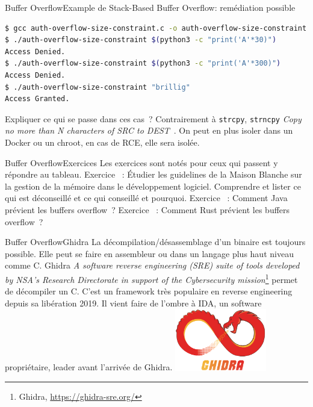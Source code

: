 \documentclass{beamer}
\begin{document}
    \begin{frame}[fragile]{Buffer Overflow}{Example de Stack-Based Buffer Overflow: remédiation possible}
        \begin{lstlisting}[language=bash]
$ gcc auth-overflow-size-constraint.c -o auth-overflow-size-constraint
$ ./auth-overflow-size-constraint $(python3 -c "print('A'*30)")
Access Denied.
$ ./auth-overflow-size-constraint $(python3 -c "print('A'*300)")
Access Denied.
$ ./auth-overflow-size-constraint "brillig"
Access Granted.
        \end{lstlisting}
        Expliquer ce qui se passe dans ces cas~?
        \pause
        \bigbreak
        Contrairement à \lstinline{strcpy}, \lstinline{strncpy} \textit{Copy no more than N characters of SRC to DEST}~.
        \bigbreak
        On peut en plus isoler dans un Docker ou un chroot, en cas de RCE, elle sera isolée.
    \end{frame}

    \begin{frame}{Buffer Overflow}{Exercices}
        Les exercices sont notés pour ceux qui passent y répondre au tableau.
        \bigbreak
        Exercice \execcounterdispinc{}~:
        Étudier les guidelines de la Maison Blanche sur la gestion de la mémoire dans le développement logiciel.
        \bigbreak
        Comprendre et lister ce qui est déconseillé et ce qui conseillé et pourquoi.
        Exercice \execcounterdispinc{}~:
        Comment Java prévient les buffers overflow~?
        \bigbreak
        Exercice \execcounterdispinc{}~:
        Comment Rust prévient les buffers overflow~?
    \end{frame}

    \begin{frame}{Buffer Overflow}{Ghidra}
        La décompilation/désassemblage d'un binaire est toujours possible.
        Elle peut se faire en assembleur ou dans un langage plus haut niveau comme C.
        \bigbreak
        Ghidra \textit{A software reverse engineering (SRE) suite of tools developed by NSA's Research Directorate in support of the Cybersecurity mission}\footnote{Ghidra, \url{https://ghidra-sre.org/}} permet de décompiler un C.
        C'est un framework très populaire en reverse engineering depuis sa libération 2019.
        Il vient faire de l'ombre à IDA, un software propriétaire, leader avant l'arrivée de Ghidra.
        \bigbreak
        \centering
        \includegraphics[width=4cm]{image/GHIDRA}
    \end{frame}
\end{document}
